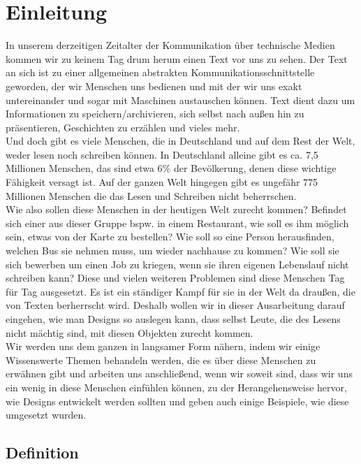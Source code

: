 \section{Einleitung}



In unserem derzeitigen Zeitalter der Kommunikation über technische Medien kommen wir zu keinem Tag drum herum einen Text vor uns zu sehen. Der Text an sich ist zu einer allgemeinen abstrakten Kommunikationsschnittstelle geworden, der wir Menschen uns bedienen und mit der wir uns exakt untereinander und sogar mit Maschinen austauschen können. Text dient dazu um Informationen zu speichern/archivieren, sich selbst nach außen hin zu präsentieren, Geschichten zu erzählen und vieles mehr.\\


Und doch gibt es viele Menschen, die in Deutschland und auf dem Rest der Welt, weder lesen noch schreiben können. In Deutschland alleine gibt es ca. 7,5 Millionen Menschen, das sind etwa 6\% der Bevölkerung, denen diese wichtige Fähigkeit versagt ist. Auf der ganzen Welt hingegen gibt es ungefähr 775 Millionen Menschen die das Lesen und Schreiben nicht beherrschen. \\


 Wie also sollen diese Menschen in der heutigen Welt zurecht kommen? Befindet sich einer aus dieser Gruppe bspw. in einem Restaurant, wie soll es ihm möglich sein, etwas von der Karte zu bestellen? Wie soll so eine Person herausfinden, welchen Bus sie nehmen muss, um wieder nachhause zu kommen? Wie soll sie sich bewerben um einen Job zu kriegen, wenn sie ihren eigenen Lebenslauf nicht schreiben kann? Diese und vielen weiteren Problemen sind diese Menschen Tag für Tag ausgesetzt. Es ist ein ständiger Kampf für sie in der Welt da draußen, die von Texten berherrscht wird. Deshalb wollen wir in dieser Ausarbeitung darauf eingehen, wie man Designs so auslegen kann, dass selbst Leute, die des Lesens nicht mächtig sind, mit diesen Objekten zurecht kommen.\\
 Wir werden uns dem ganzen in langsamer Form nähern, indem wir einige Wissenswerte Themen behandeln werden, die es über diese Menschen zu erwähnen gibt und arbeiten uns anschließend, wenn wir soweit sind, dass wir uns ein wenig in diese Menschen einfühlen können, zu der Herangehensweise hervor, wie Designs entwickelt werden sollten und geben auch einige Beispiele, wie diese umgesetzt wurden.


\subsection{Definition}



